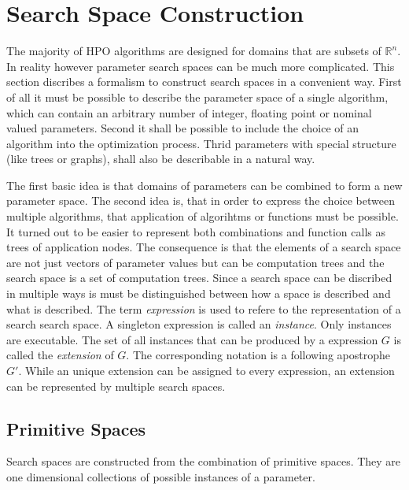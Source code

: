 \documentclass[english]{article}
\begin{document}
\newpage


\section{Search Space Construction}
\label{construction}
The majority of \ac{HPO} algorithms are designed for domains that are subsets of $\mathbb{R}^n$. In reality however parameter search spaces can be much more complicated. This section discribes a formalism to construct search spaces in a convenient way. First of all it must be possible to describe the parameter space of a single algorithm, which can contain an arbitrary number of integer, floating point or nominal valued parameters. Second it shall be possible to include the choice of an algorithm into the optimization process. Thrid parameters with special structure (like trees or graphs), shall also be describable in a natural way.

The first basic idea is that domains of parameters can be combined to form a new parameter space. The second idea is, that in order to express the choice between multiple algorithms, that application of algorihtms or functions must be possible. It turned out to be easier to represent both combinations and function calls as trees of application nodes.
The consequence is that the elements of a search space are not just vectors of parameter values but can be computation trees and the search space is a set of computation trees.
Since a search space can be discribed in multiple ways is must be distinguished between how a space is described and what is described. The term \textit{expression} is used to refere to the representation of a search search space. A singleton expression is called an \textit{instance}. Only instances are executable. The set of all instances that can be produced by a expression $G$ is called the \textit{extension} of $G$. The corresponding notation is a following apostrophe $G'$. While an unique extension can be assigned to every expression, an extension can be represented by multiple search spaces.

\subsection{Primitive Spaces}

Search spaces are constructed from the combination of primitive spaces. They are one dimensional collections of possible instances of a parameter.

\end{document}
